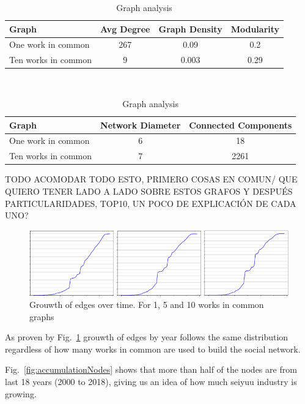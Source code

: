 \begin{table}[!hbt]
	\begin{center}
	\caption{Graph analysis}
	\label{tab:graphComparision}
	\begin{tabular}{|l|c|c|c|}
		\hline
		Graph & Avg Degree & Graph Density & Modularity \\
		\hline
		One work in common & 267 & 0.09 & 0.2 \\
		\hline
		Ten works in common & 9 & 0.003 & 0.29 \\
		\hline
	\end{tabular}\\
	\smallskip
	\begin{tabular}{|l|c|c|}
		\hline
		Graph & Network Diameter & Connected Components \\
		\hline
		One work in common & 6 & 18 \\
		\hline
		Ten works in common & 7 & 2261 \\
		\hline
	\end{tabular}
	\end{center}
\end{table}

TODO ACOMODAR TODO ESTO, PRIMERO COSAS EN COMUN/ QUE QUIERO TENER LADO A LADO SOBRE ESTOS GRAFOS Y DESPUÉS PARTICULARIDADES, TOP10, UN POCO DE EXPLICACIÓN DE CADA UNO?

\begin{figure}[!hbt]
	\begin{center}
	\includegraphics[width=\columnwidth]{graphics/edgesAccumulation.png}
	\caption{Grouwth of edges over time. For 1, 5 and 10 works in common graphs}
	\label{fig:accumulationEdges}
	\end{center}
\end{figure}

As proven by Fig.~\ref{fig:accumulationEdges} grouwth of edges by year follows the same distribution regardless of how many works in common are used to build the social network.
 
Fig.~\ref{fig:accumulationNodes} shows that more than half of the nodes are from last 18 years (2000 to 2018), giving us an idea of how much seiyuu industry is growing.

